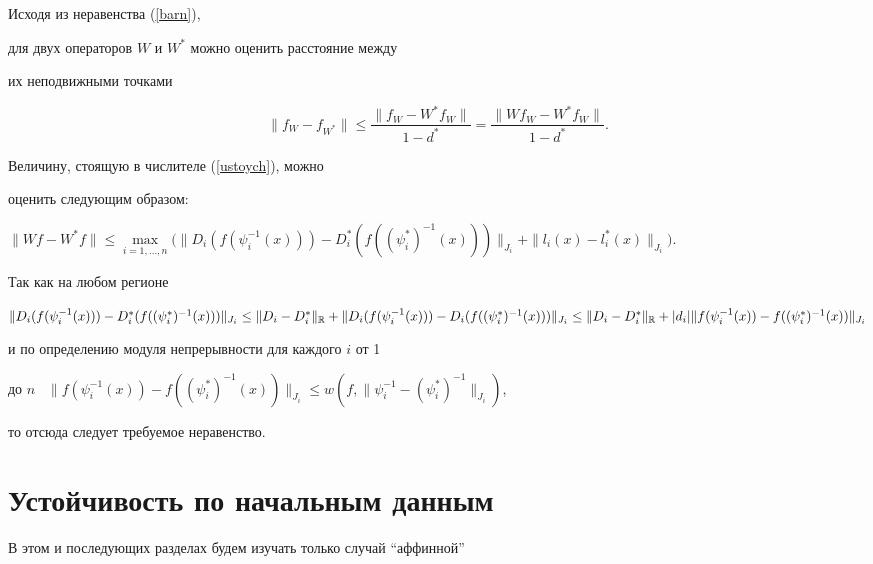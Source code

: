 \begin{pf}


Исходя из неравенства (\ref{barn}),


для двух операторов $W$ и $W^*$ можно оценить расстояние между


их неподвижными точками


\begin{equation} \label{ustoych}


\|f_W -f_{W^*}\| \le \frac{\|f_W-W^* f_W\|} {1-d^*} =


\frac{\|W f_W-W^* f_W\|} {1-d^*} .


\end{equation}


Величину, стоящую в числителе (\ref{ustoych}), можно


оценить следующим образом:


$ \| Wf - W^* f \| \le \max\limits_{i=1,\dotsc,n} \Big(


\|D_i(f(\psi_i^{-1}(x)))- D_i^*(f((\psi_i^*)^{-1}(x)))\|_{J_i}


+\|l_i(x)- l_i^*(x)\|_{J_i} \Big)$.


Так как на любом регионе


$\| D_i(f(\psi_i^{-1}(x)))- D_i^*(f((\psi_i^*)^{-1}(x)))\|_{J_i}


\le \|D_i-D_i^*\|_{\R} + \| D_i(f(\psi_i^{-1}(x)))-


D_i(f((\psi_i^*)^{-1}(x)))\|_{J_i} \le


\|D_i-D_i^*\|_{\R} + |d_i|


\|f(\psi_i^{-1}(x))-f((\psi_i^*)^{-1}(x))\|_{J_i}$


и по определению модуля непрерывности для каждого $i$ от 1


до $n$ \ $\|f(\psi_i^{-1}(x))-f((\psi_i^*)^{-1}(x))\|_{J_i}


\le w \left(f,\|\psi_i^{-1}-(\psi_i^*)^{-1}\|_{J_i} \right)$,


то отсюда следует требуемое неравенство.


\end{pf}





\section{Устойчивость по начальным данным}





В этом и последующих разделах будем изучать только случай ``аффинной''


